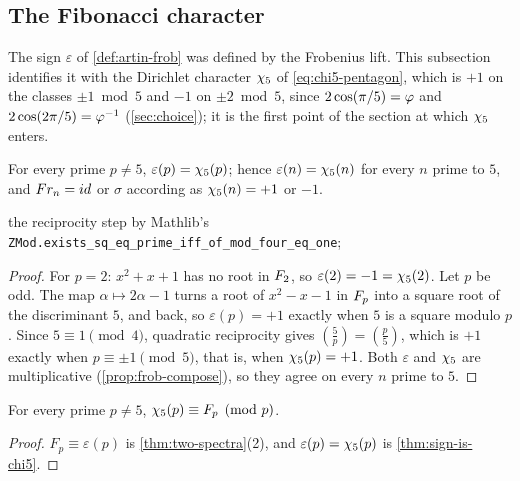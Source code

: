 \subsection{The Fibonacci character}\label{sec:chi5}

The sign $\varepsilon$ of \cref{def:artin-frob} was defined by the Frobenius lift.  This
subsection identifies it with the Dirichlet character $\chi_5$ of \eqref{eq:chi5-pentagon}, which is $+1$ on the classes $\pm1\bmod5$ and $-1$ on $\pm2\bmod5$, since $2\cos(\pi/5)=\varphi$ and $2\cos(2\pi/5)=\varphi^{-1}$ (\cref{sec:choice}); it is the
first point of the section at which $\chi_5$ enters.

\begin{theorem}\label{thm:sign-is-chi5}
For every prime $p\ne5$, $\varepsilon(p)=\chi_5(p)$; hence $\varepsilon(n)=\chi_5(n)$ for every $n$ prime to
$5$, and $Fr_n=id$ or $\sigma$ according as $\chi_5(n)=+1$ or $-1$.
\end{theorem}
the reciprocity step by Mathlib's
\texttt{ZMod.exists\_sq\_eq\_prime\_iff\_of\_mod\_four\_eq\_one};

\begin{proof}
For $p=2$: $x^2+x+1$ has no root in $F_2$, so $\varepsilon(2)=-1=\chi_5(2)$.  Let $p$ be odd.  The map
$\alpha\mapsto2\alpha-1$ turns a root of $x^2-x-1$ in $F_p$ into a square root of the discriminant $5$,
and back, so $\varepsilon(p)=+1$ exactly when $5$ is a square modulo $p$.  Since $5\equiv1\pmod4$,
quadratic reciprocity gives $\left(\frac5p\right)=\left(\frac p5\right)$, which is $+1$ exactly when
$p\equiv\pm1\pmod5$, that is, when $\chi_5(p)=+1$.  Both $\varepsilon$ and $\chi_5$ are multiplicative
(\cref{prop:frob-compose}), so they agree on every $n$ prime to $5$.
\end{proof}

\begin{theorem}\label{thm:s1}
For every prime $p\ne5$, $\chi_5(p)\equiv F_p\pmod p$.
\end{theorem}
\begin{proof}
$F_p\equiv\varepsilon(p)$ is \cref{thm:two-spectra}(2), and $\varepsilon(p)=\chi_5(p)$ is
\cref{thm:sign-is-chi5}.
\end{proof}

